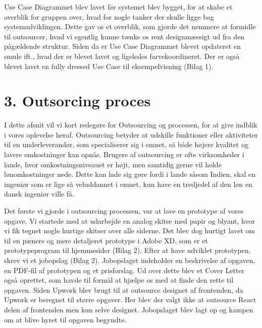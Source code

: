 \documentclass[11pt]{report}
\begin{document}
Use Case Diagrammet blev lavet før systemet blev bygget, for at skabe et overblik for gruppen over, hvad for nogle tanker der skulle ligge bag systemudviklingen. Dette gav os et overblik, som gjorde det nemmere at formidle til outsourcer, hvad vi egentlig kunne tænke os rent designmæssigt ud fra den pågældende struktur. Siden da er Use Case Diagrammet blevet opdateret en smule ift., hvad der er blevet lavet og ligeledes farvekoordineret. Der er også blevet lavet en fully dressed Use Case til eksempelvisning (Bilag 1).

\chapter*{3. Outsorcing proces}
I dette afsnit vil vi kort redegøre for Outsourcing og processen, for at give indblik i vores oplevelse heraf. Outsourcing betyder at udskille funktioner eller aktiviteter til en underleverandør, som specialiserer sig i emnet, så både højere kvalitet og lavere omkostninger kan opnås. Brugere af outsourcing er ofte virksomheder i lande, hvor omkostningsniveauet er højt, men samtidig gerne vil holde lønomkostninger nede. Dette kan lade sig gøre fordi i lande såsom Indien, skal en ingeniør som er lige så veluddannet i emnet, kun have en tredjedel af den løn en dansk ingeniør ville få.

Det første vi gjorde i outsourcing processen, var at lave en prototype af vores opgave. Vi startede med at udarbejde en analog skitse med papir og blyant, hvor  vi fik tegnet nogle hurtige skitser over alle siderne. Det blev dog hurtigt lavet om til en pænere og mere detaljeret prototype i Adobe XD, som er et prototypeprogram til hjemmesider (Bilag 2). Efter at have udviklet prototypen, skrev vi et jobopslag (Bilag 2). Jobopslaget indeholder en beskrivelse af opgaven, en PDF-fil af prototypen og et prisforslag. Ud over dette blev et Cover Letter også oprettet, som havde til formål at  hjælpe os med at finde den rette til opgaven. Siden Upwork blev brugt til at outsource designet af frontenden, da Upwork er beregnet til større opgaver. Her blev der valgt ikke at outsource React delen af frontenden men kun selve designet. Jobopslaget blev lagt op og kampen om at blive hyret til opgaven begyndte.
\end{document}

